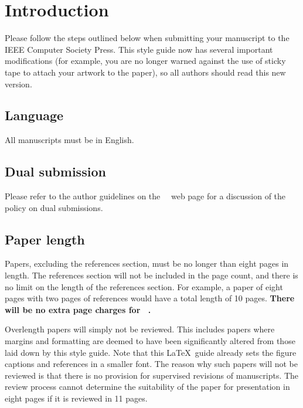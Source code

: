 \section{Introduction}
\label{sec:intro}

Please follow the steps outlined below when submitting your manuscript to the IEEE Computer Society Press.
This style guide now has several important modifications (for example, you are no longer warned against the use of sticky tape to attach your artwork to the paper), so all authors should read this new version.


\subsection{Language}

All manuscripts must be in English.

\subsection{Dual submission}

Please refer to the author guidelines on the \confName\ \confYear\ web page for a
discussion of the policy on dual submissions.

\subsection{Paper length}
Papers, excluding the references section, must be no longer than eight pages in length.
The references section will not be included in the page count, and there is no limit on the length of the references section.
For example, a paper of eight pages with two pages of references would have a total length of 10 pages.
{\bf There will be no extra page charges for \confName\ \confYear.}

Overlength papers will simply not be reviewed.
This includes papers where margins and formatting are deemed to have been significantly altered from those laid down by this style guide.
Note that this \LaTeX\ guide already sets the figure captions and references in a smaller font.
The reason why such papers will not be reviewed is that there is no provision for supervised revisions of manuscripts.
The review process cannot determine the suitability of the paper for presentation in eight pages if it is reviewed in 11 pages.


